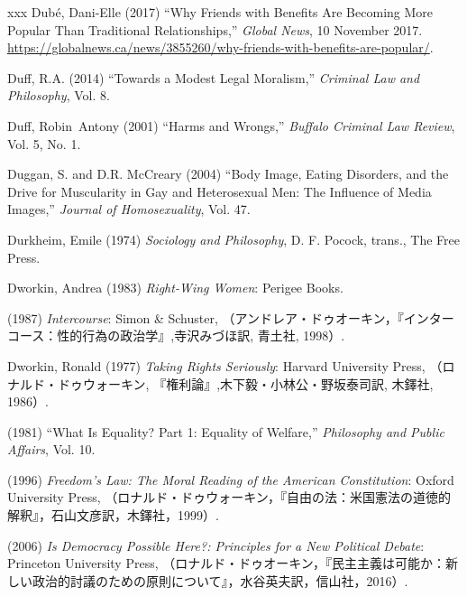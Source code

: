 \documentclass[]{jlreq} \usepackage{mystyle}
\begin{document}
\begin{thebibliography}{xxx}
Dubé, Dani-Elle (2017) ``Why Friends with Benefits Are Becoming More Popular
  Than Traditional Relationships,'' \emph{Global News}, 10 November 2017.
  \url{https://globalnews.ca/news/3855260/why-friends-with-benefits-are-popular/}.

Duff, R.A. (2014) ``Towards a Modest Legal Moralism,'' \textit{ Criminal Law
  and Philosophy}, Vol. 8.

Duff, Robin~Antony (2001) ``Harms and Wrongs,'' \textit{ Buffalo Criminal Law
  Review}, Vol. 5, No. 1.

Duggan, S. and D.R. McCreary (2004) ``Body Image, Eating Disorders, and the
  Drive for Muscularity in Gay and Heterosexual Men: The Influence of Media
  Images,'' \textit{ Journal of Homosexuality}, Vol. 47.

Durkheim, Emile (1974)  \emph{Sociology and Philosophy}, D. F. Pocock, trans.,
  The Free Press.

Dworkin, Andrea (1983)  \textit{ Right-Wing Women}: Perigee Books.

 \bysame{}  (1987)  \textit{ Intercourse}: Simon \& Schuster,
  （アンドレア・ドゥオーキン，『インターコース：性的行為の政治学』,寺沢みづほ訳,
  青土社, 1998）.

Dworkin, Ronald (1977)  \textit{ Taking Rights Seriously}: Harvard University
  Press, （ロナルド・ドゥウォーキン,
  『権利論』,木下毅・小林公・野坂泰司訳, 木鐸社, 1986）.

 \bysame{}  (1981) ``What Is Equality? Part 1: Equality of Welfare,'' \textit{
  Philosophy and Public Affairs}, Vol. 10.

 \bysame{}  (1996)  \textit{ Freedom's Law: The Moral Reading of the American
  Constitution}: Oxford University Press,
  （ロナルド・ドゥウォーキン，『自由の法：米国憲法の道徳的解釈』，石山文彦訳，木鐸社，1999）.

 \bysame{}  (2006)  \textit{ Is Democracy Possible Here?: Principles for a New
  Political Debate}: Princeton University Press,
  （ロナルド・ドゥオーキン，『民主主義は可能か：新しい政治的討議のための原則について』，水谷英夫訳，信山社，2016）.


\end{thebibliography}
\end{document}
